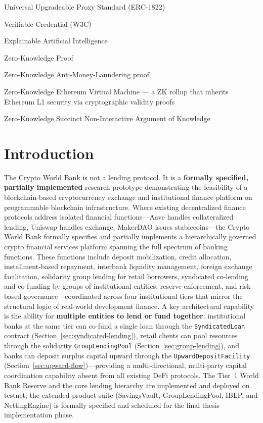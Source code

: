 \documentclass[12pt,a4paper]{report}
\begin{document}
\begin{description}[leftmargin=0pt]
    \item[UUPS:] Universal Upgradeable Proxy Standard (ERC-1822)
    \item[VC:] Verifiable Credential (W3C)
    \item[XAI:] Explainable Artificial Intelligence
    \item[ZKP:] Zero-Knowledge Proof
    \item[zkAML:] Zero-Knowledge Anti-Money-Laundering proof
    \item[zkEVM:] Zero-Knowledge Ethereum Virtual Machine --- a ZK rollup that inherits Ethereum L1 security via cryptographic validity proofs
    \item[zk-SNARK:] Zero-Knowledge Succinct Non-Interactive Argument of Knowledge
\end{description}
\newpage
{}
\setcounter{page}{1}


\chapter{Introduction}
\label{sec:intro}

The Crypto World Bank is not a lending protocol. It is a \textbf{formally specified, partially implemented} research prototype demonstrating the feasibility of a blockchain-based cryptocurrency exchange and institutional finance platform on programmable blockchain infrastructure. Where existing decentralized finance protocols address isolated financial functions---Aave handles collateralized lending, Uniswap handles exchange, MakerDAO issues stablecoins---the Crypto World Bank formally specifies and partially implements a hierarchically governed crypto financial services platform spanning the full spectrum of banking functions. These functions include deposit mobilization, credit allocation, installment-based repayment, interbank liquidity management, foreign exchange facilitation, solidarity group lending for retail borrowers, syndicated co-lending and co-funding by groups of institutional entities, reserve enforcement, and risk-based governance---coordinated across four institutional tiers that mirror the structural logic of real-world development finance. A key architectural capability is the ability for \textbf{multiple entities to lend or fund together}: institutional banks at the same tier can co-fund a single loan through the \texttt{SyndicatedLoan} contract (Section~\ref{sec:syndicated-lending}), retail clients can pool resources through the solidarity \texttt{GroupLendingPool} (Section~\ref{sec:group-lending}), and banks can deposit surplus capital upward through the \texttt{UpwardDepositFacility} (Section~\ref{sec:upward-flow})---providing a multi-directional, multi-party capital coordination capability absent from all existing DeFi protocols. The Tier~1 World Bank Reserve and the core lending hierarchy are implemented and deployed on testnet; the extended product suite (SavingsVault, GroupLendingPool, IBLP, and NettingEngine) is formally specified and scheduled for the final thesis implementation phase.
\end{document}
